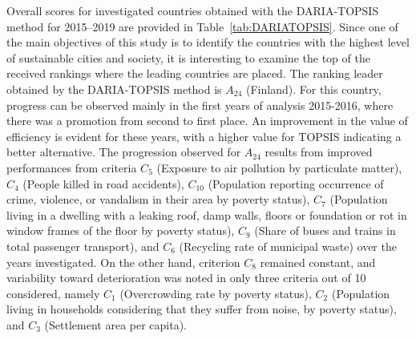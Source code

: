 \documentclass[5p,times]{elsarticle}
\begin{document}
Overall scores for investigated countries obtained with the DARIA-TOPSIS method for 2015--2019 are provided in Table~\ref{tab:DARIATOPSIS}. Since one of the main objectives of this study is to identify the countries with the highest level of sustainable cities and society, it is interesting to examine the top of the received rankings where the leading countries are placed.
The ranking leader obtained by the DARIA-TOPSIS method is $A_{24}$ (Finland). For this country, progress can be observed mainly in the first years of analysis 2015-2016, where there was a promotion from second to first place. An improvement in the value of efficiency is evident for these years, with a higher value for TOPSIS indicating a better alternative. The progression observed for $A_{24}$ results from improved performances from criteria $C_{5}$ (Exposure to air pollution by
particulate matter), $C_{4}$ (People killed in road accidents), $C_{10}$ (Population reporting occurrence of crime, violence, or vandalism in
their area by poverty status), $C_{7}$ (Population living in a dwelling with a leaking roof, damp walls, floors or foundation or rot in window
frames of the floor by poverty status), $C_{9}$ (Share of buses and trains in total passenger transport), and $C_{6}$ (Recycling rate of municipal waste) over the years investigated. On the other hand, criterion $C_{8}$ remained constant, and variability toward deterioration was noted in only three criteria out of 10 considered, namely $C_{1}$ (Overcrowding rate by poverty status), $C_{2}$ (Population living in households considering that they suffer from noise, by poverty status), and $C_{3}$ (Settlement area per capita).
%
\end{document}
